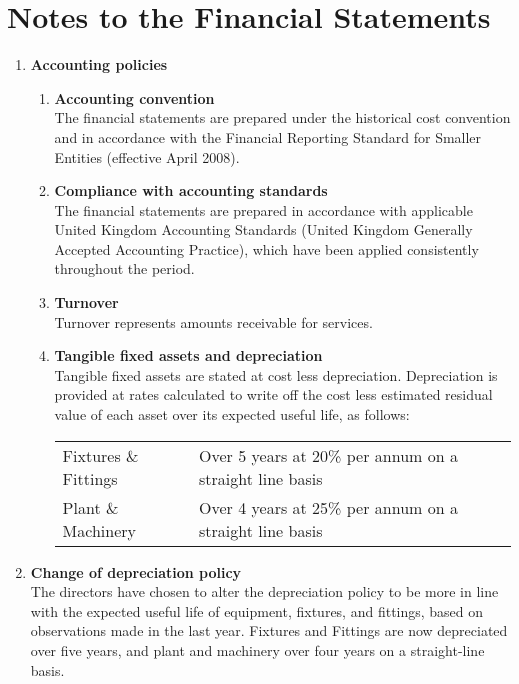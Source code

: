 \section {Notes to the Financial Statements}
\begin{enumerate}
    \item {\bf Accounting policies}
    \begin{enumerate}
        \item {\bf Accounting convention} \\
                The financial statements are prepared under the 
            historical cost convention and in accordance with the Financial Reporting 
            Standard for Smaller Entities (effective April 2008).
        \item {\bf Compliance with accounting standards} \\
            The financial statements are prepared in accordance with applicable United
            Kingdom Accounting Standards (United Kingdom Generally Accepted Accounting
            Practice), which have been applied consistently throughout the period.
        \item {\bf Turnover} \\
            Turnover represents amounts receivable for services.
        \item {\bf Tangible fixed assets and depreciation} \\
            Tangible fixed assets are stated at cost less depreciation. Depreciation is
            provided at rates calculated to write off the cost less estimated residual
            value of each asset over its expected useful life, as follows: \\[6pt]
            \begin{tabular}{  l  p{6.5cm} }
                \toprule
                Fixtures \& Fittings & Over 5 years at 20\% per annum on a straight line basis \\
                Plant \& Machinery & Over 4 years at 25\% per annum on a straight line basis \\
                \bottomrule
            \end{tabular}
    \end{enumerate}
    \item {\bf Change of depreciation policy} \label{depreciation_change} \\ 
        The directors have chosen to alter the depreciation policy to be more in line
        with the expected useful life of equipment, fixtures, and fittings, based on
        observations made in the last year. Fixtures and Fittings are now depreciated
        over five years, and plant and machinery over four years on a straight-line
        basis.


\end{enumerate}
